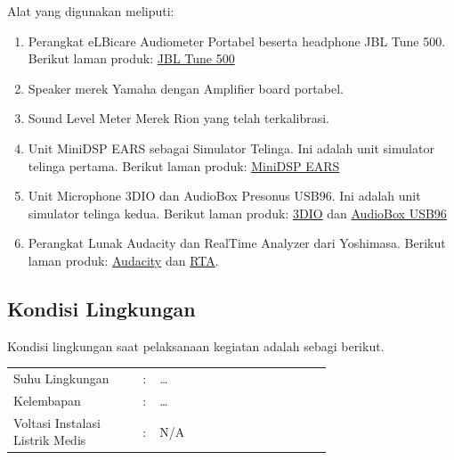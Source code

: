 \documentclass{article}
\begin{document}
	Alat yang digunakan meliputi:
	
	\begin{enumerate}
		\item Perangkat eLBicare Audiometer Portabel beserta headphone JBL Tune 500. Berikut laman produk: \href{https://id.jbl.com/over-ear-headphones/JBL+TUNE500.html}{JBL Tune 500}
		
		\item Speaker merek Yamaha dengan Amplifier board portabel.

		\item Sound Level Meter Merek Rion yang telah terkalibrasi.

		\item Unit MiniDSP EARS sebagai Simulator Telinga. Ini adalah unit simulator telinga pertama.
		Berikut laman produk: \href{https://www.minidsp.com/products/acoustic-measurement/ears-headphone-jig}{MiniDSP EARS}

		\item Unit Microphone 3DIO dan AudioBox Presonus USB96. Ini adalah unit simulator telinga kedua.
		Berikut laman produk: \href{https://3diosound.com/products/free-space-pro-binaural-microphone}{3DIO}
		dan \href{https://www.frontendaudio.com/presonus-audiobox-usb-96-usb-audio-interface/}{AudioBox USB96}

		\item Perangkat Lunak Audacity dan RealTime Analyzer dari Yoshimasa.
		Berikut laman produk: \href{https://www.audacityteam.org/}{Audacity} dan \href{http://www.ymec.com/products/dssf3e/}{RTA}.
	\end{enumerate}

	\subsection{Kondisi Lingkungan}
	
	Kondisi lingkungan saat pelaksanaan kegiatan adalah sebagi berikut.
	
	\begin{table}[H]
		\begin{tabular}{p{0.3\linewidth} p{0.01\linewidth} p{0.4\linewidth}}
			Suhu Lingkungan & : & \ldots \\ 
			Kelembapan & : & \ldots \\ 
			Voltasi Instalasi Listrik Medis & : & N/A\\ 
		\end{tabular}
	\end{table}	

	\newpage
\end{document}
